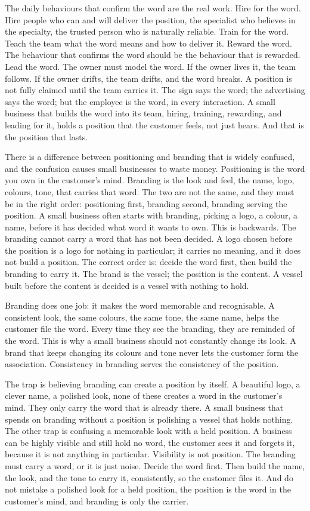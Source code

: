 \documentclass[10pt,twoside,openany]{memoir}
\begin{document}
{The daily behaviours that confirm the word are the real work. Hire for
the word. Hire people who can and will deliver the position, the
specialist who believes in the specialty, the trusted person who is
naturally reliable. Train for the word. Teach the team what the word
means and how to deliver it. Reward the word. The behaviour that
confirms the word should be the behaviour that is rewarded. Lead the
word. The owner must model the word. If the owner lives it, the team
follows. If the owner drifts, the team drifts, and the word breaks. A
position is not fully claimed until the team carries it. The sign says
the word; the advertising says the word; but the employee is the word,
in every interaction. A small business that builds the word into its
team, hiring, training, rewarding, and leading for it, holds a position
that the customer feels, not just hears. And that is the position that
lasts.

There is a difference between positioning and branding that is widely
confused, and the confusion causes small businesses to waste money.
Positioning is the word you own in the customer's mind. Branding is the
look and feel, the name, logo, colours, tone, that carries that word.
The two are not the same, and they must be in the right order:
positioning first, branding second, branding serving the position. A
small business often starts with branding, picking a logo, a colour, a
name, before it has decided what word it wants to own. This is
backwards. The branding cannot carry a word that has not been decided. A
logo chosen before the position is a logo for nothing in particular; it
carries no meaning, and it does not build a position. The correct order
is: decide the word first, then build the branding to carry it. The
brand is the vessel; the position is the content. A vessel built before
the content is decided is a vessel with nothing to hold.

Branding does one job: it makes the word memorable and recognisable. A
consistent look, the same colours, the same tone, the same name, helps
the customer file the word. Every time they see the branding, they are
reminded of the word. This is why a small business should not constantly
change its look. A brand that keeps changing its colours and tone never
lets the customer form the association. Consistency in branding serves
the consistency of the position.

The trap is believing branding can create a position by itself. A
beautiful logo, a clever name, a polished look, none of these creates a
word in the customer's mind. They only carry the word that is already
there. A small business that spends on branding without a position is
polishing a vessel that holds nothing. The other trap is confusing a
memorable look with a held position. A business can be highly visible
and still hold no word, the customer sees it and forgets it, because it
is not anything in particular. Visibility is not position. The branding
must carry a word, or it is just noise. Decide the word first. Then
build the name, the look, and the tone to carry it, consistently, so the
customer files it. And do not mistake a polished look for a held
position, the position is the word in the customer's mind, and branding
is only the carrier.

}
\end{document}
